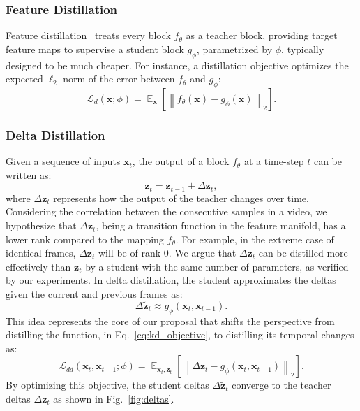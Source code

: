 \documentclass[runningheads]{llncs}
\DeclareMathOperator\E{\mathop{{}\mathbb{E}}}
\def\x{\mathbf{x}}
\def\z{\mathbf{z}}
\def\xt{\x_t}
\def\zt{\z_t}
\def\dzt{\Delta\zt}
\def\ztilde{\tilde{\mathbf{z}}}
\def\ftheta{f_{\theta}}
\def\gphi{g_{\phi}}
\def\Ldd{\mathcal{L}_{dd}}
\newcommand{\norm}[2]{\left\|#1\right\|_{#2}}
\begin{document}
\subsubsection{Feature Distillation}
Feature distillation~\cite{fitnets} treats every block $\ftheta$ as a teacher block, providing target feature maps to supervise a student block $\gphi$, parametrized by $\phi$, typically designed to be much cheaper.
For instance, a distillation objective optimizes the expected $\ell_2$ norm of the error between $\ftheta$ and $\gphi$:
\begin{equation}
\label{eq:kd_objective}
\mathcal{L}_d(\x;\phi) = \E_{\x}\left[\norm{\ftheta(\x) - \gphi(\x)}{2}\right].
\end{equation}

\subsubsection{Delta Distillation}
Given a sequence of inputs $\xt$, the output of a block $\ftheta$ at a time-step $t$ can be written as:
\begin{equation*}
\label{eq:function_dz}
\zt = \z_{t-1} + \dzt,
\end{equation*}
where $\dzt$ represents how the output of the teacher changes over time. Considering the correlation between the consecutive samples in a video, we hypothesize that $\dzt$, being a transition function in the feature manifold, has a lower rank compared to the mapping $\ftheta$. For example, in the extreme case of identical frames, $\dzt$ will be of rank $0$.
We argue that $\dzt$ can be distilled more effectively than $\zt$ by a student with the same number of parameters, as verified by our experiments. In delta distillation, the student approximates the deltas given the current and previous frames as:
\begin{equation*}
\label{eq:student}
\Delta\ztilde_t \approx \gphi(\xt, \x_{t-1}).
\end{equation*}
This idea represents the core of our proposal that shifts the perspective from distilling the function, in Eq.~\ref{eq:kd_objective}, to distilling its temporal changes as:
\begin{equation}
\label{eq:kd_objective_delta}
\Ldd (\xt,\x_{t-1};\phi) = \E_{\xt,\zt}\left[\norm{\Delta \zt - \gphi(\xt, \x_{t-1})}{2}\right].
\end{equation}
By optimizing this objective, the student deltas $\Delta\ztilde_t$ converge to the teacher deltas $\dzt$ as shown in Fig.~\ref{fig:deltas}.\\
\end{document}
